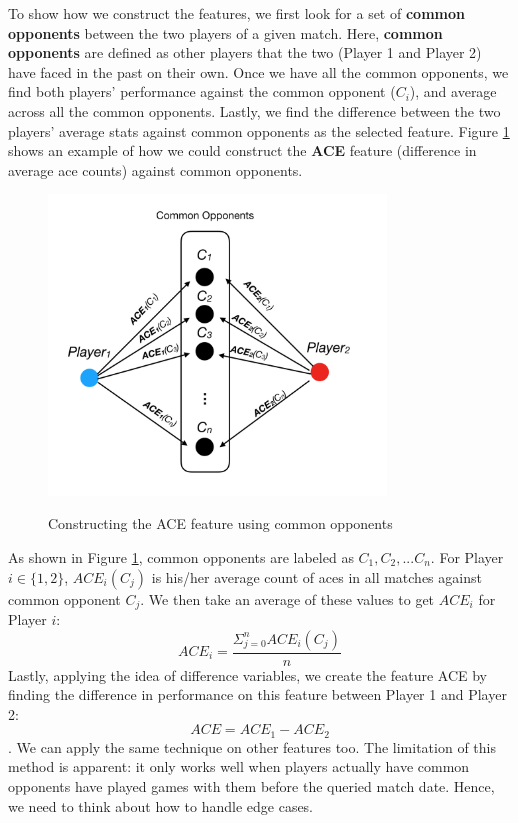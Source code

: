 \documentclass[paper=a4, fontsize=11pt]{scrartcl} %
\numberwithin{equation}{section} %
\numberwithin{figure}{section} %
\numberwithin{table}{section} %
\begin{document}
To show how we construct the features, we first look for a set of \textbf{common opponents} between the two players of a given match. Here, \textbf{common opponents} are defined as other players that the two (Player 1 and Player 2) have faced in the past on their own. Once we have all the common opponents, we find both players' performance against the common opponent ($C_i$), and average across all the common opponents. Lastly, we find the difference between the two players' average stats against common opponents as the selected feature. Figure \ref{fig:CO} shows an example of how we could construct the \textbf{ACE} feature (difference in average ace counts) against common opponents. 
\begin{figure}
  \caption{Constructing the ACE feature using common opponents}
  \centering
    \includegraphics[width=0.8\textwidth]{CO}
  \label{fig:CO}
\end{figure}
As shown in Figure \ref{fig:CO}, common opponents are labeled as $C_1, C_2, ...C_n$. For Player $i \in \{1,2\}$, $ACE_i(C_j)$ is his/her average count of aces in all matches against common opponent $C_j$. We then take an average of these values to get $ACE_i$ for Player $i$: $$ACE_i = \frac{\Sigma_{j=0}^n ACE_i(C_j)}{n}$$
Lastly, applying the idea of difference variables, we create the feature ACE by finding the difference in performance on this feature between Player 1 and Player 2: $$ACE = ACE_1 - ACE_2$$. 
We can apply the same technique on other features too. The limitation of this method is apparent: it only works well when players actually have common opponents have played games with them before the queried match date. Hence, we need to think about how to handle edge cases.
\end{document}
